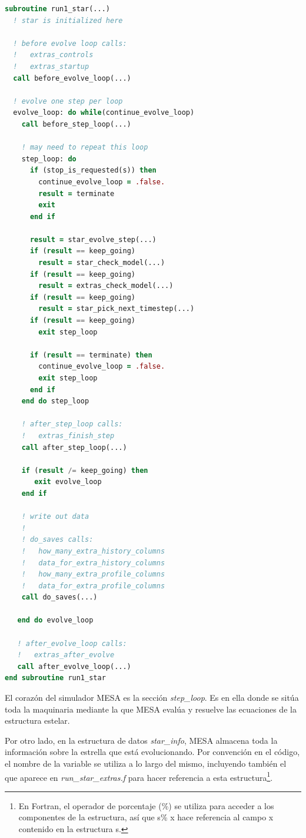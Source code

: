 \begin{lstlisting}[language=Fortran, float, caption={Bucle de control principal sobre el que itera MESA en cada paso temporal}, label={lst:bucle_ctrl}]
subroutine run1_star(...)
  ! star is initialized here

  ! before evolve loop calls:
  !   extras_controls
  !   extras_startup
  call before_evolve_loop(...)

  ! evolve one step per loop
  evolve_loop: do while(continue_evolve_loop)
    call before_step_loop(...)

    ! may need to repeat this loop
    step_loop: do 
      if (stop_is_requested(s)) then
        continue_evolve_loop = .false.
        result = terminate
        exit
      end if

      result = star_evolve_step(...)
      if (result == keep_going) 
        result = star_check_model(...)
      if (result == keep_going) 
        result = extras_check_model(...)
      if (result == keep_going)
        result = star_pick_next_timestep(...)
      if (result == keep_going) 
        exit step_loop

      if (result == terminate) then
        continue_evolve_loop = .false.
        exit step_loop
      end if
    end do step_loop

    ! after_step_loop calls:
    !   extras_finish_step
    call after_step_loop(...)

    if (result /= keep_going) then
       exit evolve_loop
    end if

    ! write out data
    !
    ! do_saves calls:
    !   how_many_extra_history_columns
    !   data_for_extra_history_columns
    !   how_many_extra_profile_columns
    !   data_for_extra_profile_columns
    call do_saves(...)

   end do evolve_loop

   ! after_evolve_loop calls:
   !   extras_after_evolve
   call after_evolve_loop(...)
end subroutine run1_star
\end{lstlisting}

El corazón del simulador MESA es la sección \textit{step\_loop}. Es en ella donde se sitúa toda la maquinaria mediante la que MESA evalúa y resuelve las ecuaciones de la estructura estelar.\par

Por otro lado, en la estructura de datos \textit{star\_info}, MESA almacena toda la información sobre la estrella que está evolucionando. Por convención en el código, el nombre de la variable se utiliza a lo largo del mismo, incluyendo también el que aparece en \textit{run\_star\_extras.f} para hacer referencia a esta estructura\footnote{En Fortran, el operador de porcentaje (\%) se utiliza para acceder a los componentes de la estructura, así que s\% x hace referencia al campo x contenido en la estructura s.}.\par

